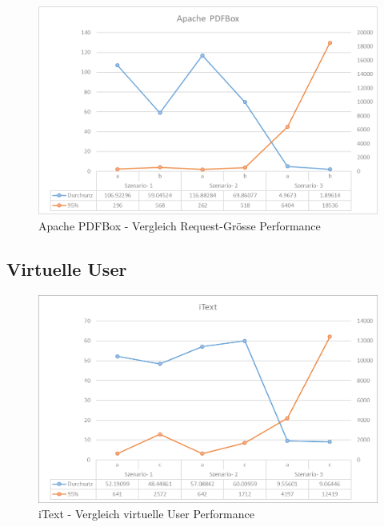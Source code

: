 \documentclass[main.tex]{subfiles}
\begin{document}
\begin{figure}[ht]
\includegraphics[width=\textwidth/2]{mainpart/4_analyse_img/PdfBox_ab.png}
  \caption{Apache PDFBox - Vergleich Request-Grösse Performance}
 \label{figure:vglReqPdfBox}
\end{figure}




\subsection{Virtuelle User}

\begin{figure}[h]
\includegraphics[width=\textwidth/2]{mainpart/4_analyse_img/iText_ac.png}
 \caption{iText - Vergleich virtuelle User Performance}
 \label{figure:vglVUitext}
\end{figure}
\end{document}
